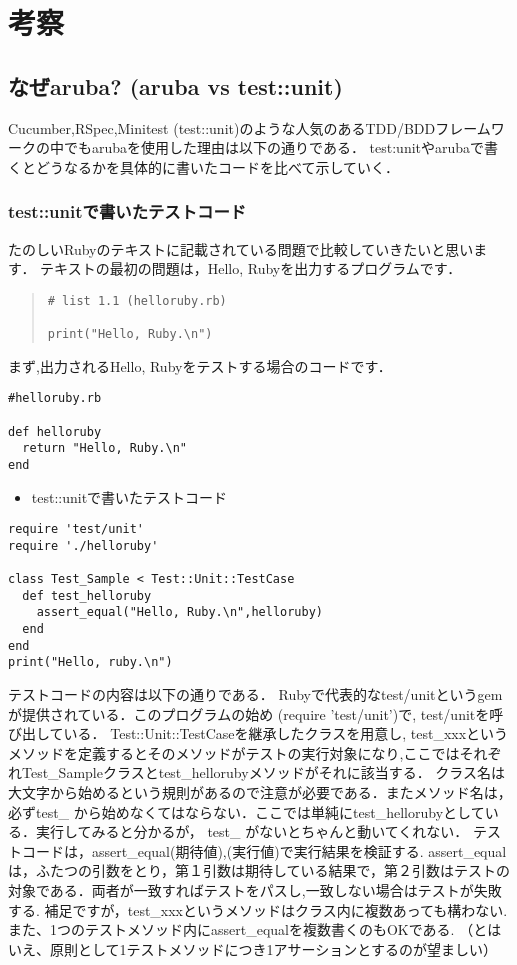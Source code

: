 
\section{考察}
\subsection{なぜaruba? (aruba vs test::unit)}
Cucumber,RSpec,Minitest (test::unit)のような人気のあるTDD/BDDフレームワークの中でもarubaを使用した理由は以下の通りである．
test:unitやarubaで書くとどうなるかを具体的に書いたコードを比べて示していく．

\subsubsection{test::unitで書いたテストコード}
たのしいRubyのテキストに記載されている問題で比較していきたいと思います．
テキストの最初の問題は，Hello, Rubyを出力するプログラムです．
\begin{quote}\begin{verbatim}
# list 1.1 (helloruby.rb)

print("Hello, Ruby.\n")
\end{verbatim}\end{quote}
まず,出力されるHello, Rubyをテストする場合のコードです．
\begin{lstlisting}[style=customRuby,basicstyle={\scriptsize\ttfamily}]
#helloruby.rb

def helloruby
  return "Hello, Ruby.\n"
end
\end{lstlisting}
\begin{itemize}
\item test::unitで書いたテストコード
\end{itemize}\begin{lstlisting}[style=customRuby,basicstyle={\scriptsize\ttfamily}]
require 'test/unit'
require './helloruby'

class Test_Sample < Test::Unit::TestCase
  def test_helloruby
    assert_equal("Hello, Ruby.\n",helloruby)
  end
end
print("Hello, ruby.\n")
\end{lstlisting}

テストコードの内容は以下の通りである．
Rubyで代表的なtest/unitというgemが提供されている．このプログラムの始め (require 'test/unit')で, test/unitを呼び出している．
Test::Unit::TestCaseを継承したクラスを用意し, test\_xxxというメソッドを定義するとそのメソッドがテストの実行対象になり,ここではそれぞれTest\_Sampleクラスとtest\_hellorubyメソッドがそれに該当する．
クラス名は大文字から始めるという規則があるので注意が必要である．またメソッド名は，必ずtest\_ から始めなくてはならない．ここでは単純にtest\_hellorubyとしている．実行してみると分かるが，
test\_ がないとちゃんと動いてくれない．
テストコードは，assert\_equal(期待値),(実行値)で実行結果を検証する. assert\_equalは，ふたつの引数をとり，第１引数は期待している結果で，第２引数はテストの対象である．両者が一致すればテストをパスし,一致しない場合はテストが失敗する.
補足ですが，test\_xxxというメソッドはクラス内に複数あっても構わない.また、1つのテストメソッド内にassert\_equalを複数書くのもOKである.
（とはいえ、原則として1テストメソッドにつき1アサーションとするのが望ましい）

